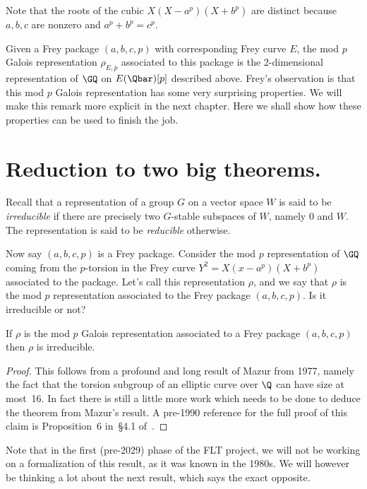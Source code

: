 Note that the roots of the cubic $X(X-a^p)(X+b^p)$ are distinct because $a,b,c$ are nonzero and
$a^p+b^p=c^p$.

Given a Frey package $(a,b,c,p)$ with corresponding Frey curve $E$, the mod $p$ Galois
representation $\rho_{E,p}$ associated to this package is the 2-dimensional representation of
$\GQ$ on $E(\Qbar)[p]$ described above. Frey's observation is that this mod $p$ Galois
representation has some very surprising properties. We will make this remark more explicit
in the next chapter. Here we shall show how these properties can be used to finish the job.

\section{Reduction to two big theorems.}

Recall that a representation of a group $G$ on a vector space $W$ is said to be \emph{irreducible}
if there are precisely two $G$-stable subspaces of $W$, namely $0$ and $W$.
The representation is said to be \emph{reducible} otherwise.

Now say $(a,b,c,p)$ is a Frey package.
Consider the mod $p$ representation of $\GQ$ coming from the $p$-torsion in the Frey
curve $Y^2=X(x-a^p)(X+b^p)$ associated to the package. Let's call this representation $\rho$,
and we say that $\rho$ is the mod $p$ representation associated to the Frey package $(a,b,c,p)$.
Is it irreducible or not?

\begin{theorem}[Mazur]
  \label{Mazur_Frey}
  \leanok
  If $\rho$ is the mod $p$ Galois representation associated to a Frey package $(a,b,c,p)$ then
  $\rho$ is irreducible.
\end{theorem}
\begin{proof}
  \notready
  This follows from a profound and long result of Mazur \cite{mazur-torsion} from 1977,
  namely the fact that the torsion subgroup of an elliptic curve over $\Q$ can have size at most~16.
  In fact there is still a little more work which needs to be done to deduce the theorem from
  Mazur's result. A pre-1990 reference for the full proof of this claim is Proposition~6
  in~\S4.1 of~\cite{serreconj}.
\end{proof}

Note that in the first (pre-2029) phase of the FLT project, we will not be working on
a formalization of this result, as it was known in the 1980s. We will however be thinking
a lot about the next result, which says the exact opposite.

